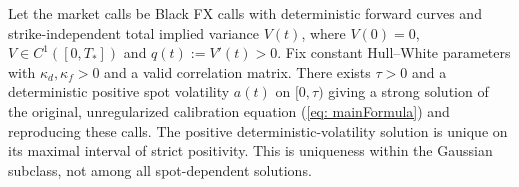 \begin{prop}
\label{prop: gaussianExistence}
Let the market calls be Black FX calls with deterministic forward curves and
strike-independent total implied variance $V(t)$, where $V(0)=0$,
$V\in C^1([0,T_*])$ and $q(t):=V'(t)>0$. Fix constant Hull--White parameters
with $\kappa_d,\kappa_f>0$ and a valid correlation matrix. There exists $\tau>0$
and a deterministic positive spot volatility $a(t)$ on $[0,\tau)$ giving a
strong solution of the original, unregularized calibration equation
(\ref{eq: mainFormula}) and reproducing these calls.
The positive deterministic-volatility solution is unique on its maximal
interval of strict positivity. This is uniqueness within the Gaussian subclass,
not among all spot-dependent solutions.
\end{prop}
